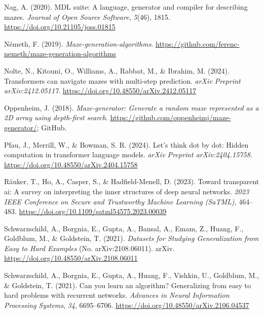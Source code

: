\documentclass[10pt,a4paper,onecolumn]{article}
\newlength{\cslhangindent}
\newenvironment{CSLReferences}[2] %
 {\begin{list}{}{%
  \setlength{\itemindent}{0pt}
  \setlength{\leftmargin}{0pt}
  \setlength{\parsep}{0pt}
  \ifodd #1
   \setlength{\leftmargin}{\cslhangindent}
   \setlength{\itemindent}{-1\cslhangindent}
  \fi
  \setlength{\itemsep}{#2\baselineskip}}}
 {\end{list}}
\begin{document}
\begin{CSLReferences}{1}{0.5}
\leavevmode{}%
Nag, A. (2020). MDL suite: A language, generator and compiler for
describing mazes. \emph{Journal of Open Source Software}, \emph{5}(46),
1815. \url{https://doi.org/10.21105/joss.01815}

\leavevmode{}%
Németh, F. (2019). \emph{Maze-generation-algorithms}.
\url{https://github.com/ferenc-nemeth/maze-generation-algorithms}

\leavevmode{}%
Nolte, N., Kitouni, O., Williams, A., Rabbat, M., \& Ibrahim, M. (2024).
Transformers can navigate mazes with multi-step prediction. \emph{arXiv
Preprint arXiv:2412.05117}.
\url{https://doi.org/10.48550/arXiv.2412.05117}

\leavevmode{}%
Oppenheim, J. (2018). \emph{Maze-generator: Generate a random maze
represented as a 2D array using depth-first search}.
\url{https://github.com/oppenheimj/maze-generator/}; GitHub.

\leavevmode{}%
Pfau, J., Merrill, W., \& Bowman, S. R. (2024). Let's think dot by dot:
Hidden computation in transformer language models. \emph{arXiv Preprint
arXiv:2404.15758}. \url{https://doi.org/10.48550/arXiv.2404.15758}

\leavevmode{}%
Räuker, T., Ho, A., Casper, S., \& Hadfield-Menell, D. (2023). Toward
transparent ai: A survey on interpreting the inner structures of deep
neural networks. \emph{2023 IEEE Conference on Secure and Trustworthy
Machine Learning (SaTML)}, 464--483.
\url{https://doi.org/10.1109/satml54575.2023.00039}

\leavevmode{}%
Schwarzschild, A., Borgnia, E., Gupta, A., Bansal, A., Emam, Z., Huang,
F., Goldblum, M., \& Goldstein, T. (2021). \emph{Datasets for {Studying
Generalization} from {Easy} to {Hard Examples}} (No. arXiv:2108.06011).
{arXiv}. \url{https://doi.org/10.48550/arXiv.2108.06011}

\leavevmode{}%
Schwarzschild, A., Borgnia, E., Gupta, A., Huang, F., Vishkin, U.,
Goldblum, M., \& Goldstein, T. (2021). Can you learn an algorithm?
Generalizing from easy to hard problems with recurrent networks.
\emph{Advances in Neural Information Processing Systems}, \emph{34},
6695--6706. \url{https://doi.org/10.48550/arXiv.2106.04537}


\end{CSLReferences}
\end{document}
